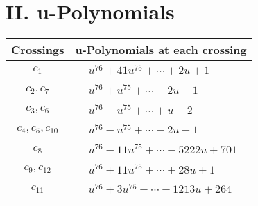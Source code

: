 \documentclass[1p]{elsarticle_modified}
\theoremstyle{definition}
\begin{document}
\newpage\renewcommand{\arraystretch}{1}
\centering \section*{ II. u-Polynomials}
\begin{tabular}{m{50pt}|m{274pt}}
Crossings & \hspace{64pt}u-Polynomials at each crossing \\
\hline $$\begin{aligned}c_{1}\end{aligned}$$&$\begin{aligned}
&u^{76}+41 u^{75}+\cdots+2 u+1
\end{aligned}$\\
\hline $$\begin{aligned}c_{2},c_{7}\end{aligned}$$&$\begin{aligned}
&u^{76}+u^{75}+\cdots-2 u-1
\end{aligned}$\\
\hline $$\begin{aligned}c_{3},c_{6}\end{aligned}$$&$\begin{aligned}
&u^{76}- u^{75}+\cdots+u-2
\end{aligned}$\\
\hline $$\begin{aligned}c_{4},c_{5},c_{10}\end{aligned}$$&$\begin{aligned}
&u^{76}- u^{75}+\cdots-2 u-1
\end{aligned}$\\
\hline $$\begin{aligned}c_{8}\end{aligned}$$&$\begin{aligned}
&u^{76}-11 u^{75}+\cdots-5222 u+701
\end{aligned}$\\
\hline $$\begin{aligned}c_{9},c_{12}\end{aligned}$$&$\begin{aligned}
&u^{76}+11 u^{75}+\cdots+28 u+1
\end{aligned}$\\
\hline $$\begin{aligned}c_{11}\end{aligned}$$&$\begin{aligned}
&u^{76}+3 u^{75}+\cdots+1213 u+264
\end{aligned}$\\
\hline
\end{tabular}\newpage\renewcommand{\arraystretch}{1}
\end{document}
